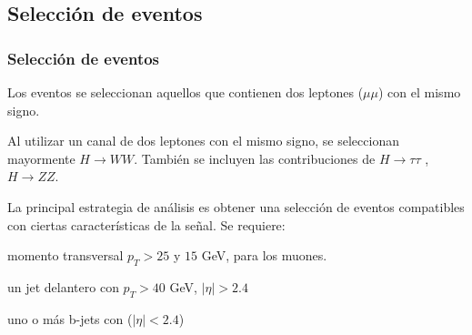 \documentclass[11pt]{beamer}
\begin{document}
\begin{frame}
\section{Selecci\'on de eventos}
\frametitle{Selecci\'on de eventos}


\begin{itemize}
\scriptsize{
\item Los eventos se seleccionan aquellos que contienen dos leptones ($\mu \mu$) con el mismo signo.
\item  Al utilizar un canal de dos leptones con el mismo signo, se seleccionan mayormente $ H \rightarrow WW $. También se incluyen las contribuciones de $ H \rightarrow \tau \tau $ ,$ H \rightarrow ZZ $. 
\item La principal estrategia de análisis es obtener una selección de eventos compatibles con ciertas características de la señal. Se requiere:} 

\begin{itemize}
\tiny{
	\item momento transversal $p_T> 25$ y $15$ GeV, para los muones.
	\item un jet delantero con  $p_T > 40$ GeV, $|\eta| > 2.4$ 
	\item uno o m\'as b-jets con ($|\eta| < 2.4$) %
}
\end{itemize}

\end{itemize}

\end{frame}
\end{document}
